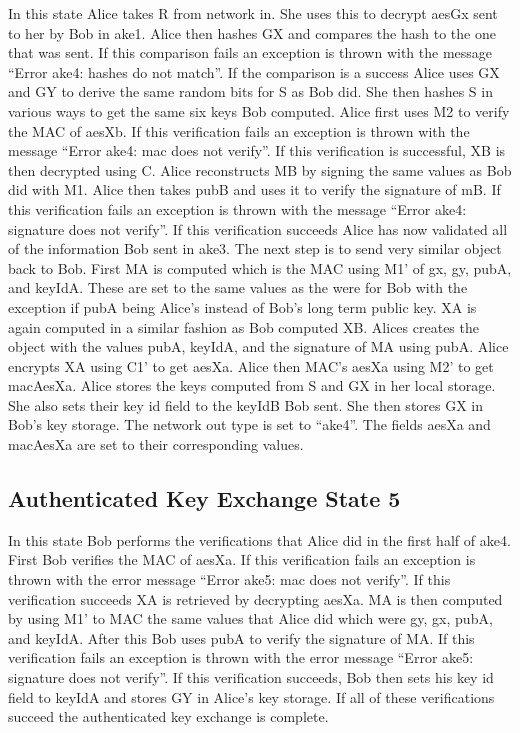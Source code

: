 In this state Alice takes R from network in. She uses this to decrypt aesGx sent to her by Bob in ake1. Alice then hashes GX and compares the hash to the one that was sent. If this comparison fails an exception is thrown with the message “Error ake4: hashes do not match”. If the comparison is a success Alice uses GX and GY to derive the same random bits for S as Bob did. She then hashes S in various ways to get the same six keys Bob computed. Alice first uses M2 to verify the MAC of aesXb. If this verification fails an exception is thrown with the message “Error ake4: mac does not verify”. If this verification is successful, XB is then decrypted using C. Alice reconstructs MB by signing the same values as Bob did with M1. Alice then takes pubB and uses it to verify the signature of mB. If this verification fails an exception is thrown with the message “Error ake4: signature does not verify”. If this verification succeeds Alice has now validated all of the information Bob sent in ake3. The next step is to send very similar object back to Bob. First MA is computed which is the MAC using M1’ of gx, gy, pubA, and keyIdA. These are set to the same values as the were for Bob with the exception if pubA being Alice’s instead of Bob’s long term public key. XA is again computed in a similar fashion as Bob computed XB. Alices creates the object with the values pubA, keyIdA, and the signature of MA using pubA. Alice encrypts XA using C1’ to get aesXa. Alice then MAC’s aesXa using M2’ to get macAesXa. Alice stores the keys computed from S and GX in her local storage. She also sets their key id field to the keyIdB Bob sent. She then stores GX in Bob’s key storage. The network out type is set to “ake4”. The fields aesXa and macAesXa are set to their corresponding values.


\subsection{Authenticated Key Exchange State 5}


In this state Bob performs the verifications that Alice did in the first half of ake4. First Bob verifies the MAC of aesXa. If this verification fails an exception is thrown with the error message “Error ake5: mac does not verify”. If this verification succeeds XA is retrieved by decrypting aesXa. MA is then computed by using M1’ to MAC the same values that Alice did which were gy, gx, pubA, and keyIdA. After this Bob uses pubA to verify the signature of MA. If this verification fails an exception is thrown with the error message “Error ake5: signature does not verify”. If this verification succeeds, Bob then sets his key id field to keyIdA and stores GY in Alice’s key storage. If all of these verifications succeed the authenticated key exchange is complete.


